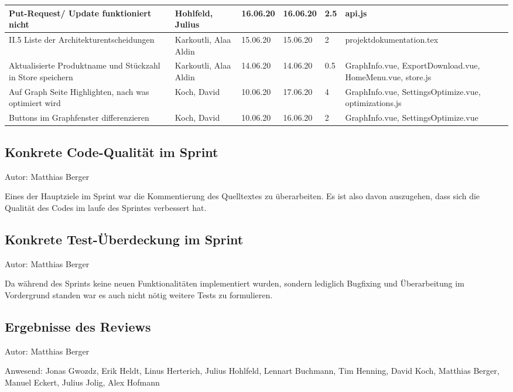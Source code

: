 \begin{longtable}{|p{4cm}|p{2cm}|p{1.2cm}|p{1.2cm}|p{0.7cm}|p{3.8cm}|}
      Put-Request/ Update funktioniert nicht                                 & Hohlfeld, Julius      & 16.06.20 & 16.06.20 & 2.5  & api.js                                                    \\ \hline
      II.5 Liste der Architekturentscheidungen                               & Karkoutli, Alaa Aldin & 15.06.20 & 15.06.20 & 2    & projektdokumentation.tex                                  \\ \hline
      Aktualisierte Produktname und Stückzahl in Store speichern             & Karkoutli, Alaa Aldin & 14.06.20 & 14.06.20 & 0.5  & GraphInfo.vue, ExportDownload.vue, HomeMenu.vue, store.js \\ \hline
      Auf Graph Seite Highlighten, nach was optimiert wird                   & Koch, David           & 10.06.20 & 17.06.20 & 4    & GraphInfo.vue, SettingsOptimize.vue, optimizations.js     \\ \hline
      Buttons im Graphfenster differenzieren                                 & Koch, David           & 10.06.20 & 16.06.20 & 2    & GraphInfo.vue, SettingsOptimize.vue                       \\ \hline
\end{longtable}


\subsection{Konkrete Code-Qualität im Sprint}
{\small Autor: Matthias Berger}

Eines der Hauptziele im Sprint war die Kommentierung des Quelltextes zu überarbeiten. Es ist also davon auszugehen, dass sich die Qualität des Codes im laufe des Sprintes verbessert hat.

\subsection{Konkrete Test-Überdeckung im Sprint}
{\small Autor: Matthias Berger}

Da während des Sprints keine neuen Funktionalitäten implementiert wurden, sondern lediglich Bugfixing und Überarbeitung  im Vordergrund standen war es auch nicht nötig weitere Tests zu formulieren.

\subsection{Ergebnisse des Reviews}
{\small Autor: Matthias Berger}

Anwesend: Jonas Gwozdz, Erik Heldt, Linus Herterich, Julius Hohlfeld, Lennart Buchmann, Tim Henning, David Koch, Matthias Berger, Manuel Eckert, Julius Jolig, Alex Hofmann\\

